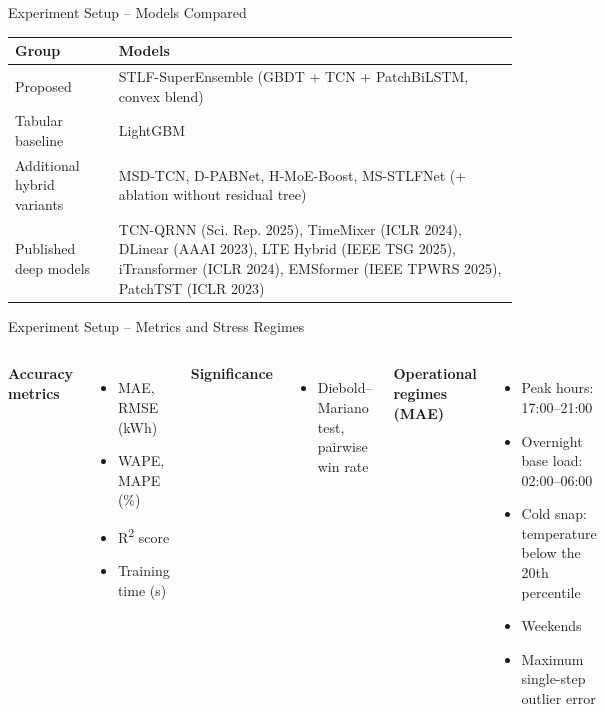 \documentclass[aspectratio=169]{beamer}
\begin{document}
\begin{frame}{Experiment Setup -- Models Compared}
  \small
  \begin{tabular}{p{4.0cm}p{8.6cm}}
    \toprule
    \textbf{Group} & \textbf{Models} \\ \midrule
    Proposed & STLF-SuperEnsemble (GBDT + TCN + PatchBiLSTM, convex blend) \\
    Tabular baseline & LightGBM \\
    Additional hybrid variants & MSD-TCN, D-PABNet, H-MoE-Boost, MS-STLFNet (+ ablation without residual tree) \\
    Published deep models & TCN-QRNN (Sci. Rep. 2025), TimeMixer (ICLR 2024), DLinear (AAAI 2023), LTE Hybrid (IEEE TSG 2025), iTransformer (ICLR 2024), EMSformer (IEEE TPWRS 2025), PatchTST (ICLR 2023) \\ \bottomrule
  \end{tabular}
\end{frame}

\begin{frame}{Experiment Setup -- Metrics and Stress Regimes}
  \small
  \begin{columns}[T]
    \textbf{Accuracy metrics}
    \begin{itemize}
      \item MAE, RMSE (kWh)
      \item WAPE, MAPE (\%)
      \item R\textsuperscript{2} score
      \item Training time (s)
    \end{itemize}
    \textbf{Significance}
    \begin{itemize}
      \item Diebold--Mariano test, pairwise win rate
    \end{itemize}
    \textbf{Operational regimes (MAE)}
    \begin{itemize}
      \item Peak hours: 17:00--21:00
      \item Overnight base load: 02:00--06:00
      \item Cold snap: temperature below the 20th percentile
      \item Weekends
      \item Maximum single-step outlier error
    \end{itemize}
  \end{columns}
\end{frame}
\end{document}
